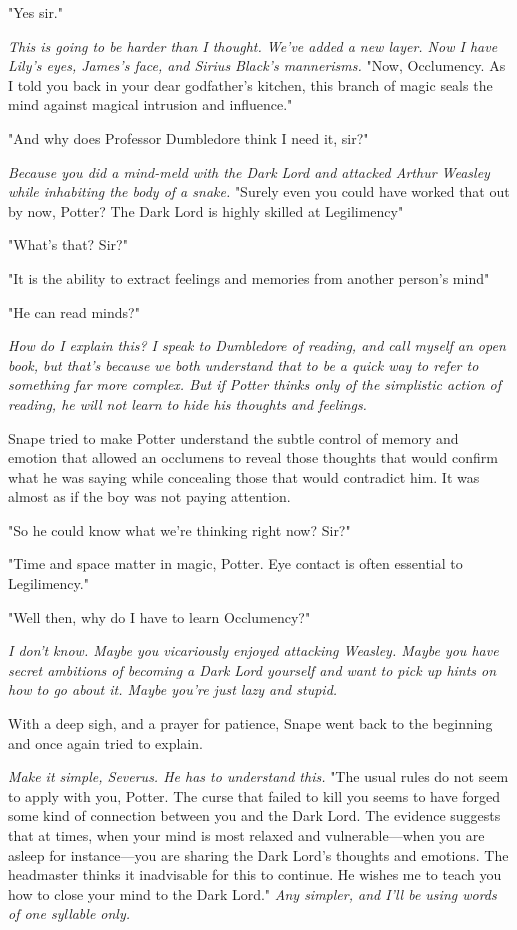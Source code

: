 "Yes{\el} sir."

\emph{This is going to be harder than I thought. We've added a new layer. Now I have Lily's eyes, James's face, and Sirius Black's mannerisms.} "Now, Occlumency. As I told you back in your dear godfather's kitchen, this branch of magic seals the mind against magical intrusion and influence."

"And why does Professor Dumbledore think I need it, sir?"

\emph{Because you did a mind-meld with the Dark Lord and attacked Arthur Weasley while inhabiting the body of a snake.} "Surely even you could have worked that out by now, Potter? The Dark Lord is highly skilled at Legilimency{\el}"

"What's that? Sir?"

"It is the ability to extract feelings and memories from another person's mind{\el}"

"He can read minds?"

\emph{How do I explain this? I speak to Dumbledore of reading, and call myself an open book, but that's because we both understand that to be a quick way to refer to something far more complex. But if Potter thinks only of the simplistic action of reading, he will not learn to hide his thoughts and feelings.}

Snape tried to make Potter understand the subtle control of memory and emotion that allowed an occlumens to reveal those thoughts that would confirm what he was saying while concealing those that would contradict him. It was almost as if the boy was not paying attention.

"So he could know what we're thinking right now? Sir?"

"Time and space matter in magic, Potter. Eye contact is often essential to Legilimency."

"Well then, why do I have to learn Occlumency?"

\emph{I don't know. Maybe you vicariously enjoyed attacking Weasley. Maybe you have secret ambitions of becoming a Dark Lord yourself and want to pick up hints on how to go about it. Maybe you're just lazy and stupid.}

With a deep sigh, and a prayer for patience, Snape went back to the beginning and once again tried to explain.

\emph{Make it simple, Severus. He has to understand this.} "The usual rules do not seem to apply with you, Potter. The curse that failed to kill you seems to have forged some kind of connection between you and the Dark Lord. The evidence suggests that at times, when your mind is most relaxed and vulnerable—when you are asleep for instance—you are sharing the Dark Lord's thoughts and emotions. The headmaster thinks it inadvisable for this to continue. He wishes me to teach you how to close your mind to the Dark Lord." \emph{Any simpler, and I'll be using words of one syllable only.}

